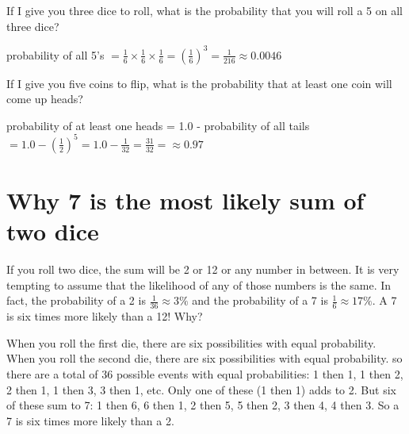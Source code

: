 \begin{Exercise}[title={Rolling Dice}, label=rolling-dice]
  If I give you three dice to roll, what is the
  probability that you will roll a 5 on all three dice?
\end{Exercise}
\begin{Answer}[ref=rolling-dice]
  probability of all 5's $ = \frac{1}{6}\times\frac{1}{6}\times\frac{1}{6} = \left(\frac{1}{6}\right)^3 = \frac{1}{216} \approx 0.0046$
  \end{Answer}
    
\begin{Exercise}[title={Flipping Coins}, label=flipping-coins]
  If I give you five coins to flip, what is the
  probability that at least one coin will come up heads?
\end{Exercise}
\begin{Answer}[ref=rolling-dice]
  probability of at least one heads = 1.0 - probability of all tails $ = 1.0 - \left(\frac{1}{2}\right)^5 =1.0 - \frac{1}{32} = \frac{31}{32} = \approx 0.97$ 
  \end{Answer}
    
\section{Why 7 is the most likely sum of two dice}

If you roll two dice, the sum will be 2 or 12 or any number in
between. It is very tempting to assume that the likelihood of any of
those numbers is the same. In fact, the probability of a 2 is
$\frac{1}{36} \approx 3\%$ and the probability of a 7 is $\frac{1}{6}
\approx 17\%$. A 7 is six times more likely than a 12! Why?

When you roll the first die, there are six possibilities with equal
probability. When you roll the second die, there are six possibilities
with equal probability. so there are a total of 36 possible events
with equal probabilities: 1 then 1, 1 then 2, 2 then 1, 1 then 3, 3
then 1, etc. Only one of these (1 then 1) adds to 2.  But six of these
sum to 7: 1 then 6, 6 then 1, 2 then 5, 5 then 2, 3 then 4, 4 then
3. So a 7 is six times more likely than a 2.

